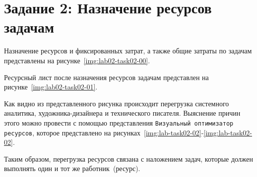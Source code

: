 \section{Задание 2: Назначение ресурсов задачам}

Назначение ресурсов и фиксированных затрат, а также общие затраты по задачам представлены на рисунке~\ref{img:lab02-task02-00}.


Ресурсный лист после назначения ресурсов задачам представлен на
рисунке~\ref{img:lab02-task02-01}.


Как видно из представленного рисунка происходит перегрузка системного
аналитика, художника-дизайнера и технического писателя. Выяснение причин этого
можно провести с помощью представления \texttt{Визуальный оптимизатор
ресурсов}, которое представлено на
рисунках~\ref{img:lab-task02-02}-\ref{img:lab-task02-02}.



Таким образом, перегрузка ресурсов связана с наложением задач, которые должен
выполнять один и тот же работник~(ресурс).
